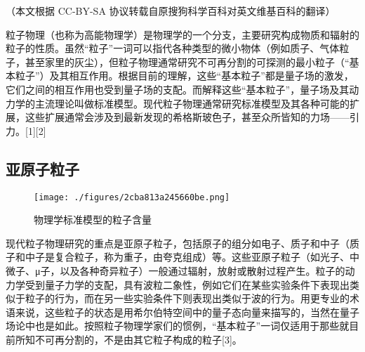 
（本文根据 CC-BY-SA 协议转载自原搜狗科学百科对英文维基百科的翻译）

粒子物理（也称为高能物理学）是物理学的一个分支，主要研究构成物质和辐射的粒子的性质。虽然“粒子”一词可以指代各种类型的微小物体（例如质子、气体粒子，甚至家里的灰尘），但粒子物理通常研究不可再分割的可探测的最小粒子（“基本粒子”）及其相互作用。根据目前的理解，这些“基本粒子”都是量子场的激发，它们之间的相互作用也受到量子场的支配。而解释这些“基本粒子”，量子场及其动力学的主流理论叫做标准模型。现代粒子物理通常研究标准模型及其各种可能的扩展，这些扩展通常会涉及到最新发现的希格斯玻色子，甚至众所皆知的力场——引力。[1][2]

\subsection{亚原子粒子}
\begin{figure}[ht]
\centering
\texttt{[image: ./figures/2cba813a245660be.png]}
\caption{物理学标准模型的粒子含量} \label{fig_GNWL_1}
\end{figure}

现代粒子物理研究的重点是亚原子粒子，包括原子的组分如电子、质子和中子（质子和中子是复合粒子，称为重子，由夸克组成）等。这些亚原子粒子（如光子、中微子、μ子，以及各种奇异粒子）一般通过辐射，放射或散射过程产生。粒子的动力学受到量子力学的支配，具有波粒二象性，例如它们在某些实验条件下表现出类似于粒子的行为，而在另一些实验条件下则表现出类似于波的行为。用更专业的术语来说，这些粒子的状态是用希尔伯特空间中的量子态向量来描写的，当然在量子场论中也是如此。按照粒子物理学家们的惯例，“基本粒子”一词仅适用于那些就目前所知不可再分割的，不是由其它粒子构成的粒子[3]。

